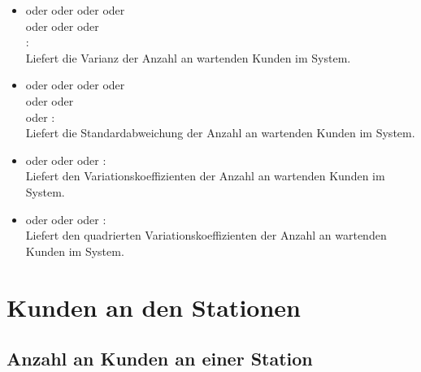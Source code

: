 \begin{itemize}
\item
{} oder  oder  oder  oder\\
 oder  oder  oder\\
:\\
Liefert die Varianz der Anzahl an wartenden Kunden im System.

\item
{} oder  oder  oder  oder\\
 oder  oder\\
 oder :\\
Liefert die Standardabweichung der Anzahl an wartenden Kunden im System.

\item
{} oder  oder  oder :\\
Liefert den Variationskoeffizienten der Anzahl an wartenden Kunden im System.

\item
{} oder  oder  oder :\\
Liefert den quadrierten Variationskoeffizienten der Anzahl an wartenden Kunden im System.

\end{itemize}





\section{Kunden an den Stationen}



\subsection{Anzahl an Kunden an einer Station}

